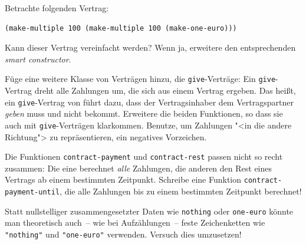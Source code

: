 \begin{aufgabe}
  Betrachte folgenden Vertrag:
\begin{lstlisting}
(make-multiple 100 (make-multiple 100 (make-one-euro)))    
\end{lstlisting}
%
Kann dieser Vertrag vereinfacht werden?  Wenn ja, erweitere den
entsprechenden \textit{smart constructor}.
\end{aufgabe}

\begin{aufgabe}\label{aufgabe:give}
  Füge eine weitere Klasse von Verträgen hinzu, die
  \lstinline{give}-Verträge: Ein \lstinline{give}-Vertrag dreht alle
  Zahlungen um, die sich aus einem Vertrag ergeben.  Das heißt, ein
  \lstinline{give}-Vertrag von  führt dazu, dass der
  Vertragsinhaber dem Vertragspartner  \emph{geben} muss und
  nicht bekommt.  Erweitere die beiden Funktionen, so dass sie auch
  mit \lstinline{give}-Verträgen klarkommen.  Benutze, um Zahlungen
  "<in die andere Richtung"> zu repräsentieren, ein negatives
  Vorzeichen.
\end{aufgabe}

\begin{aufgabe}
  Die Funktionen \lstinline{contract-payment} und
  \lstinline{contract-rest} passen nicht so recht zusammen: Die eine
  berechnet \emph{alle} Zahlungen, die anderen den Rest eines Vertrags
  ab einem bestimmten Zeitpunkt.  Schreibe eine Funktion
  \lstinline{contract-payment-until}, die alle Zahlungen bis zu einem
  bestimmten Zeitpunkt berechnet!
\end{aufgabe}

\begin{aufgabe}\label{aufgabe:aufzaehlung-vs-nullstellig}
  Statt nullstelliger zusammengesetzter Daten wie \lstinline{nothing}
  oder \lstinline{one-euro} könnte man theoretisch auch~-- wie bei
  Aufzählungen~-- feste Zeichenketten wie \lstinline{"nothing"} und
  \lstinline{"one-euro"} verwenden.  Versuch dies umzusetzen!
\end{aufgabe}



